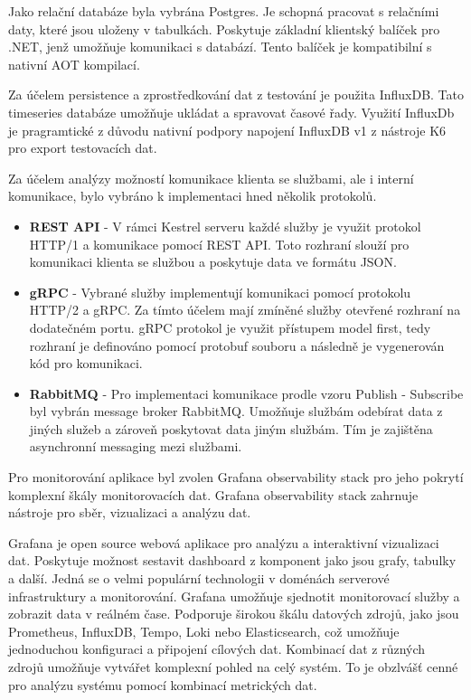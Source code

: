 
Jako relační databáze byla vybrána Postgres. Je schopná pracovat s relačními daty, které jsou uloženy v tabulkách. Poskytuje základní klientský balíček pro .NET, jenž umožňuje komunikaci s databází. Tento balíček je kompatibilní s nativní AOT kompilací.

Za účelem persistence a zprostředkování dat z testování je použita InfluxDB. Tato timeseries databáze umožňuje ukládat a spravovat časové řady. Využití InfluxDb je pragramtické z důvodu nativní podpory napojení InfluxDB v1 z nástroje K6 pro export testovacích dat.


Za účelem analýzy možností komunikace klienta se službami, ale i interní komunikace, bylo vybráno k implementaci hned několik protokolů. 

\begin{itemize}
  \item \textbf{REST API} - V rámci Kestrel serveru každé služby je využit protokol HTTP/1 a komunikace pomocí REST API. Toto rozhraní slouží pro komunikaci klienta se službou a poskytuje data ve formátu JSON.
  \item \textbf{gRPC} - Vybrané služby implementují komunikaci pomocí protokolu HTTP/2 a gRPC. Za tímto účelem mají zmíněné služby otevřené rozhraní na dodatečném portu. gRPC protokol je využit přístupem model first, tedy rozhraní je definováno pomocí protobuf souboru a následně je vygenerován kód pro komunikaci.
  \item \textbf{RabbitMQ} - Pro implementaci komunikace prodle vzoru Publish - Subscribe byl vybrán message broker RabbitMQ. Umožňuje službám odebírat data z jiných služeb a zároveň poskytovat data jiným službám. Tím je zajištěna asynchronní messaging mezi službami.
\end{itemize}


Pro monitorování aplikace byl zvolen Grafana observability stack pro jeho pokrytí komplexní škály monitorovacích dat. Grafana observability stack zahrnuje nástroje pro sběr, vizualizaci a analýzu dat.


Grafana je open source webová aplikace pro analýzu a interaktivní vizualizaci dat. Poskytuje možnost sestavit dashboard z komponent jako jsou grafy, tabulky a další. Jedná se o velmi populární technologii v doménách serverové infrastruktury a monitorování. Grafana umožňuje sjednotit monitorovací služby a zobrazit data v reálném čase. Podporuje širokou škálu datových zdrojů, jako jsou Prometheus, InfluxDB, Tempo, Loki nebo Elasticsearch, což umožňuje jednoduchou konfiguraci a připojení cílových dat. Kombinací dat z různých zdrojů umožňuje vytvářet komplexní pohled na celý systém. To je obzlvášť cenné pro analýzu systému pomocí kombinací metrických dat.

